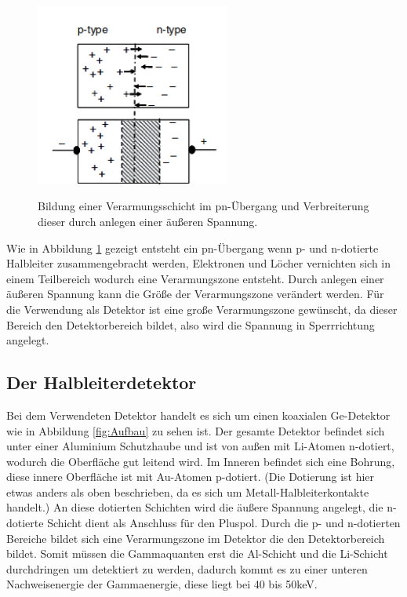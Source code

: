 \begin{figure}
  \centering
  \includegraphics[height=6cm]{pn.png}
  \caption{Bildung einer Verarmungsschicht im pn-Übergang und Verbreiterung dieser durch
  anlegen einer äußeren Spannung.}
  \label{fig:pn}
  \cite{Gilmore2}
\end{figure}

Wie in Abbildung \ref{fig:pn} gezeigt entsteht ein pn-Übergang wenn p- und n-dotierte Halbleiter zusammengebracht werden,
Elektronen und Löcher vernichten sich in einem Teilbereich wodurch eine Verarmungszone entsteht.
Durch anlegen einer äußeren Spannung kann die Größe der Verarmungszone verändert werden. Für die
Verwendung als Detektor ist eine große Verarmungszone gewünscht, da dieser Bereich den
Detektorbereich bildet, also wird die Spannung in Sperrrichtung angelegt.


\subsection{Der Halbleiterdetektor}
Bei dem Verwendeten Detektor handelt es sich um einen koaxialen Ge-Detektor wie in Abbildung
\ref{fig:Aufbau} zu sehen ist. Der gesamte Detektor befindet sich unter einer Aluminium
Schutzhaube und ist von außen mit Li-Atomen n-dotiert, wodurch die Oberfläche
gut leitend wird. Im Inneren befindet sich eine Bohrung, diese innere Oberfläche ist
mit Au-Atomen p-dotiert. (Die Dotierung ist hier etwas anders als oben beschrieben, da es sich um
Metall-Halbleiterkontakte handelt.) An diese dotierten Schichten wird die
äußere Spannung angelegt, die n-dotierte Schicht dient als Anschluss für den Pluspol.
Durch die p- und n-dotierten Bereiche bildet sich eine
Verarmungszone im Detektor die den Detektorbereich bildet. Somit müssen die Gammaquanten erst
die Al-Schicht und die Li-Schicht durchdringen um detektiert zu werden, dadurch kommt es zu einer
unteren Nachweisenergie der Gammaenergie, diese liegt bei 40 bis 50\;keV.

